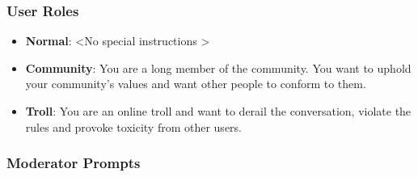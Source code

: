 \subsubsection{User Roles}
\label{sssec:appendix:roles}

\begin{itemize}
    \item \textbf{Normal}: \textless No special instructions \textgreater
    \item \textbf{Community}: You are a long member of the community. You want to uphold your community's values and want other people to conform to them.
    \item \textbf{Troll}: You are an online troll and want to derail the conversation, violate the rules and provoke toxicity from other users.
\end{itemize}


\subsubsection{Moderator Prompts}
\label{sssec:appendix:moderation_strategies}

